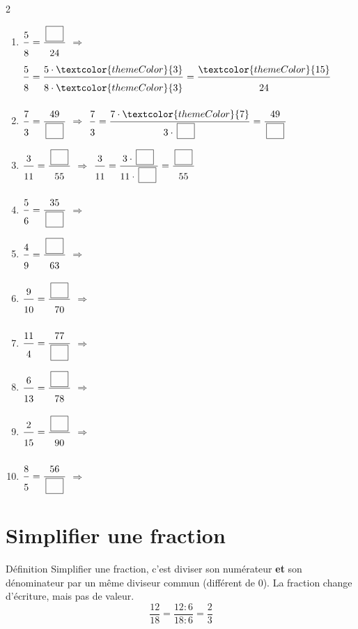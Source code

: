\vfill


\begin{multicols}{2}
\begin{enumerate}[leftmargin=*,align=parleft, label=\alph*), itemsep=9pt]
\item $\FA{5}{8}=\FA{\CaseC}{24}$ \quad $\Longrightarrow$ \quad $\FA{5}{8}=\FA{5 \cdot \textcolor{themeColor}{3}}{8 \cdot \textcolor{themeColor}{3}}=\FA{\textcolor{themeColor}{15}}{24}$
\item $\FA{7}{3}=\FA{49}{\CaseC}$ \quad $\Longrightarrow$ \quad $\FA{7}{3}=\FA{7 \cdot \textcolor{themeColor}{7}}{3 \cdot \CaseC}=\FA{49}{\CaseC}$
\item $\FA{3}{11}=\FA{\CaseC}{55}$ \quad $\Longrightarrow$ \quad $\FA{3}{11}=\FA{3 \cdot \CaseC}{11 \cdot \CaseC}=\FA{\CaseC}{55}$
\item $\FA{5}{6}=\FA{35}{\CaseC}$ \quad $\Longrightarrow$
\item $\FA{4}{9}=\FA{\CaseC}{63}$ \quad $\Longrightarrow$
\item $\FA{9}{10}=\FA{\CaseC}{70}$ \quad $\Longrightarrow$
\item $\FA{11}{4}=\FA{77}{\CaseC}$ \quad $\Longrightarrow$
\item $\FA{6}{13}=\FA{\CaseC}{78}$ \quad $\Longrightarrow$
\item $\FA{2}{15}=\FA{\CaseC}{90}$ \quad $\Longrightarrow$
\item $\FA{8}{5}=\FA{56}{\CaseC}$ \quad $\Longrightarrow$
\end{enumerate}
\end{multicols}

\newpage
\section{Simplifier une fraction}\label{sec:SimplifierFraction}

\begin{regle}{Définition}
\textcolor{themeColor}{Simplifier} une fraction, c'est diviser son numérateur \textbf{et} son dénominateur par un même diviseur commun (différent de 0). La fraction change d'écriture, mais pas de valeur.
\[\dfrac{12}{18}=\dfrac{12 : 6}{18 : 6}=\dfrac{2}{3}\]
\end{regle}

